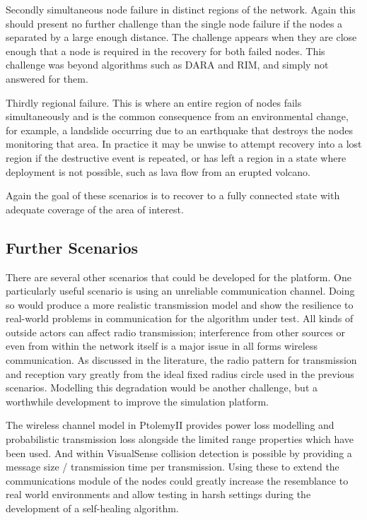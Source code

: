 \documentclass[authoryearcitations]{UoYCSproject}
\begin{document}
Secondly simultaneous node failure in distinct regions of the network. Again this should present no further challenge than the single node failure if the nodes a separated by a large enough distance. The challenge appears when they are close enough that a node is required in the recovery for both failed nodes. This challenge was beyond algorithms such as DARA and RIM, and simply not answered for them.

Thirdly regional failure. This is where an entire region of nodes fails simultaneously and is the common consequence from an environmental change, for example, a landslide occurring due to an earthquake that destroys the nodes monitoring that area. In practice it may be unwise to attempt recovery into a lost region if the destructive event is repeated, or has left a region in a state where deployment is not possible, such as lava flow from an erupted volcano.

Again the goal of these scenarios is to recover to a fully connected state with adequate coverage of the area of interest.

\subsection{Further Scenarios}

There are several other scenarios that could be developed for the platform. One particularly useful scenario is using an unreliable communication channel. Doing so would produce a more realistic transmission model and show the resilience to real-world problems in communication for the algorithm under test. All kinds of outside actors can affect radio transmission; interference from other sources or even from within the network itself is a major issue in all forms wireless communication. As discussed in the literature, the radio pattern for transmission and reception vary greatly from the ideal fixed radius circle used in the previous scenarios. Modelling this degradation would be another challenge, but a worthwhile development to improve the simulation platform.

The wireless channel model in PtolemyII provides power loss modelling and probabilistic transmission loss alongside the limited range properties which have been used. And within VisualSense collision detection is possible by providing a message size / transmission time per transmission. Using these to extend the communications module of the nodes could greatly increase the resemblance to real world environments and allow testing in harsh settings during the development of a self-healing algorithm.
\end{document}
